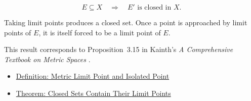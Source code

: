 \begin{remark*}
\[
E\subseteq X
\quad\Longrightarrow\quad
E'\text{ is closed in }X.
\]
\end{remark*}

\begin{remark*}[Interpretation]
Taking limit points produces a closed set.  Once a point is approached by
limit points of \(E\), it is itself forced to be a limit point of \(E\).
\end{remark*}

\begin{remark*}
This result corresponds to Proposition~3.15 in Kainth's
\emph{A Comprehensive Textbook on Metric Spaces}
\cite{KainthComprehensiveMetricSpaces2023}.
\end{remark*}

\begin{dependencies}
\begin{itemize}
  \item \hyperref[def:metric-limit-point-isolated-point]{Definition: Metric Limit Point and Isolated Point}
  \item \hyperref[thm:metric-closed-sets-contain-limit-points]{Theorem: Closed Sets Contain Their Limit Points}
\end{itemize}
\end{dependencies}
